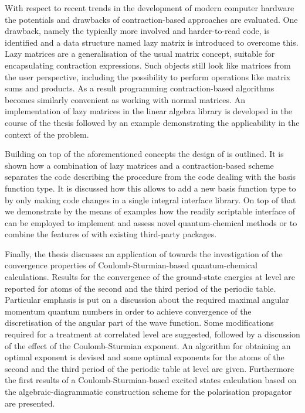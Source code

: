 With respect to recent trends in the development of modern computer hardware
the potentials and drawbacks of contraction-based approaches are evaluated.
One drawback, namely the typically more involved and harder-to-read code,
is identified and a data structure named lazy matrix is introduced
to overcome this.
Lazy matrices are a generalisation of the usual matrix concept,
suitable for encapsulating contraction expressions.
Such objects still look like matrices from the user perspective,
including the possibility to perform operations like matrix sums and products.
As a result programming contraction-based algorithms
becomes similarly convenient as working with normal matrices.
An implementation of lazy matrices in the \lazyten linear algebra library
is developed in the course of the thesis followed by an example
demonstrating the applicability in the context of the \HF problem.

Building on top of the aforementioned concepts the design of \molsturm is outlined.
It is shown how a combination of lazy matrices and a contraction-based \SCF scheme
separates the code describing the \SCF procedure
from the code dealing with the basis function type.
It is discussed how this allows to add a new basis function type
to \molsturm by only making code changes in a single integral interface library.
On top of that we demonstrate by the means of examples
how the readily scriptable interface of \molsturm
can be employed to implement and assess novel quantum-chemical methods
or to combine the features of \molsturm with existing third-party packages.

Finally, the thesis discusses an application of \molsturm
towards the investigation of the convergence properties
of Coulomb-Sturmian-based quantum-chemical calculations.
Results for the convergence
of the ground-state energies at \HF level
are reported for atoms of the second and the third period
of the periodic table.
Particular emphasis is put on a discussion about the required
maximal angular momentum quantum numbers
in order to achieve convergence
of the discretisation of the angular part of the wave function.
Some modifications required for a treatment at correlated level are suggested,
followed by a discussion of the effect of the Coulomb-Sturmian exponent.
An algorithm for obtaining an optimal exponent is devised
and some optimal exponents for the atoms of the
second and the third period of the periodic table at \HF level are given.
Furthermore the first results of a Coulomb-Sturmian-based excited
states calculation based on the algebraic-diagrammatic construction
scheme for the polarisation propagator are presented.


